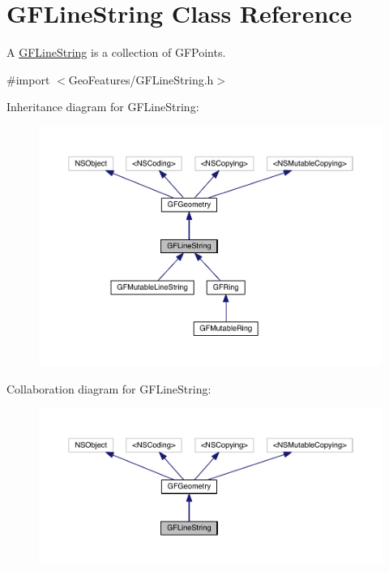\hypertarget{interface_g_f_line_string}{}\section{G\+F\+Line\+String Class Reference}
\label{interface_g_f_line_string}


A \hyperlink{interface_g_f_line_string}{G\+F\+Line\+String} is a collection of G\+F\+Points.  




{\ttfamily \#import $<$Geo\+Features/\+G\+F\+Line\+String.\+h$>$}



Inheritance diagram for G\+F\+Line\+String\+:
\nopagebreak
\begin{figure}[H]
\begin{center}
\leavevmode
\includegraphics[width=350pt]{interface_g_f_line_string__inherit__graph}
\end{center}
\end{figure}


Collaboration diagram for G\+F\+Line\+String\+:
\nopagebreak
\begin{figure}[H]
\begin{center}
\leavevmode
\includegraphics[width=350pt]{interface_g_f_line_string__coll__graph}
\end{center}
\end{figure}

